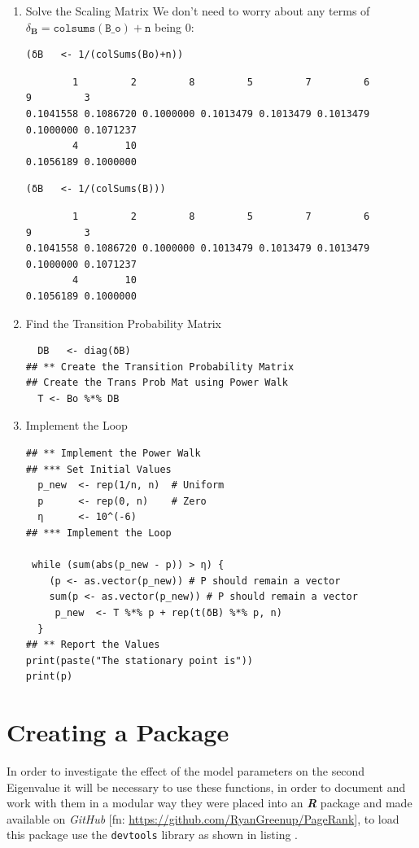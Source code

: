 \documentclass[11pt]{article}
\begin{document}
\begin{enumerate}
\item Solve the Scaling Matrix
\label{sec:orge7eaa54}
We don't need to worry about any terms of \(\delta_{\mathbf{B}} = \mathtt{colsums\left(B\_o\right)+n}\) being 0:

\begin{verbatim}
(δB   <- 1/(colSums(Bo)+n))
\end{verbatim}

\begin{verbatim}
        1         2         8         5         7         6         9         3
0.1041558 0.1086720 0.1000000 0.1013479 0.1013479 0.1013479 0.1000000 0.1071237
        4        10
0.1056189 0.1000000
\end{verbatim}


\begin{verbatim}
(δB   <- 1/(colSums(B)))
\end{verbatim}

\begin{verbatim}
        1         2         8         5         7         6         9         3
0.1041558 0.1086720 0.1000000 0.1013479 0.1013479 0.1013479 0.1000000 0.1071237
        4        10
0.1056189 0.1000000
\end{verbatim}


\item Find the Transition Probability Matrix
\label{sec:org5ec884b}
\begin{verbatim}
  DB   <- diag(δB)
## ** Create the Transition Probability Matrix
## Create the Trans Prob Mat using Power Walk
  T <- Bo %*% DB
\end{verbatim}

\item Implement the Loop
\label{sec:orgace1179}
\begin{verbatim}
## ** Implement the Power Walk
## *** Set Initial Values
  p_new  <- rep(1/n, n)  # Uniform
  p      <- rep(0, n)    # Zero
  η      <- 10^(-6)
## *** Implement the Loop

 while (sum(abs(p_new - p)) > η) {
    (p <- as.vector(p_new)) # P should remain a vector
    sum(p <- as.vector(p_new)) # P should remain a vector
     p_new  <- T %*% p + rep(t(δB) %*% p, n)
  }
## ** Report the Values
print(paste("The stationary point is"))
print(p)
\end{verbatim}
\end{enumerate}

\section{Creating a Package}
\label{create-package}
In order to investigate the effect of the model parameters on the second
Eigenvalue it will be necessary to use these functions, in order to document and
work with them in a modular way they were placed into an \textbf{\emph{R}} package and made
available on \emph{GitHub} [fn: \url{https://github.com/RyanGreenup/PageRank}], to load this package use the \texttt{devtools} library as shown in listing .
\end{document}
